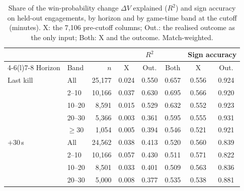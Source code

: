 \begin{table}[!t]
\centering
\caption{Share of the win-probability change $\Delta V$ explained ($R^2$) and sign accuracy on held-out
engagements, by horizon and by game-time band at the cutoff (minutes). X: the 7,106 pre-cutoff columns;
Out.: the realised outcome as the only input; Both: X and the outcome. Match-weighted.}
\label{tab:limit-explained}
\footnotesize
\setlength{\tabcolsep}{3.2pt}
\begin{tabular}{@{}llrccccc@{}}
\toprule
 & & & \multicolumn{3}{c}{$R^2$} & \multicolumn{2}{c}{Sign accuracy} \\
\cmidrule(lr){4-6}\cmidrule(l){7-8}
Horizon & Band & $n$ & X & Out. & Both & X & Out. \\
\midrule
Last kill & All & 25,177 & 0.024 & 0.550 & 0.657 & 0.556 & 0.924 \\
 & 2--10 & 10,166 & 0.037 & 0.630 & 0.695 & 0.566 & 0.920 \\
 & 10--20 & 8,591 & 0.015 & 0.529 & 0.632 & 0.552 & 0.923 \\
 & 20--30 & 5,366 & 0.003 & 0.361 & 0.595 & 0.555 & 0.931 \\
 & $\geq 30$ & 1,054 & 0.005 & 0.394 & 0.546 & 0.521 & 0.921 \\
\midrule
$+30$\,s & All & 24,562 & 0.038 & 0.413 & 0.520 & 0.560 & 0.839 \\
 & 2--10 & 10,166 & 0.057 & 0.430 & 0.511 & 0.571 & 0.822 \\
 & 10--20 & 8,501 & 0.033 & 0.401 & 0.509 & 0.563 & 0.836 \\
 & 20--30 & 5,000 & 0.008 & 0.377 & 0.535 & 0.538 & 0.881 \\

\end{tabular}
\end{table}
